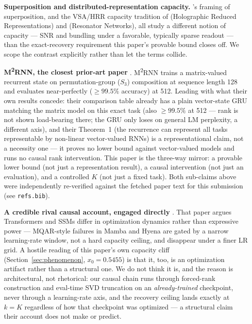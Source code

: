 \textbf{Superposition and distributed-representation capacity.}
\citet{elhage2022superposition}'s framing of superposition, and the
VSA/HRR capacity tradition of \citet{plate1995holographic} (Holographic
Reduced Representations) and \citet{frady2020resonator} (Resonator
Networks), all study a different notion of capacity --- SNR and bundling
under a favorable, typically sparse readout --- than the exact-recovery
requirement this paper's provable bound closes off. We scope the
contrast explicitly rather than let the terms collide.

\textbf{M\textsuperscript{2}RNN, the closest prior-art paper}
\citep{mishra2026m2rnn}. M\textsuperscript{2}RNN trains a matrix-valued
recurrent state on permutation-group ($S_3$) composition at sequence
length 128 and evaluates near-perfectly ($\geq99.5\%$ accuracy) at 512.
Leading with what their own results concede: their comparison table
already has a plain vector-state GRU matching the matrix model on this
exact task (also $\geq99.5\%$ at 512 --- rank is not shown load-bearing
there; the GRU only loses on general LM perplexity, a different axis),
and their Theorem~1 (the recurrence can represent all tasks representable
by non-linear vector-valued RNNs) is a representational claim, not a
necessity one --- it proves no lower bound against vector-valued models
and runs no causal rank intervention. This paper is the three-way mirror:
a provable lower bound (not just a representation result), a causal
intervention (not just an evaluation), and a controlled $K$ (not just a
fixed task). Both sub-claims above were independently re-verified against
the fetched paper text for this submission (see \texttt{refs.bib}).

\textbf{A credible rival causal account, engaged directly}
\citep{okpekpe2025revisiting}. That paper argues Transformers and SSMs
differ in optimization dynamics rather than expressive power --- MQAR-style
failures in Mamba and Hyena are gated by a narrow learning-rate window,
not a hard capacity ceiling, and disappear under a finer LR grid. A
hostile reading of this paper's own capacity cliff
(Section~\ref{sec:phenomenon}, $x_0{=}0.5455$) is that it, too, is an
optimization artifact rather than a structural one. We do not think it
is, and the reason is architectural, not rhetorical: our causal chain
runs through forced-rank construction and eval-time SVD truncation on an
\emph{already-trained} checkpoint, never through a learning-rate axis, and
the recovery ceiling lands exactly at $k{=}K$ regardless of how that
checkpoint was optimized --- a structural claim their account does not
make or predict.

